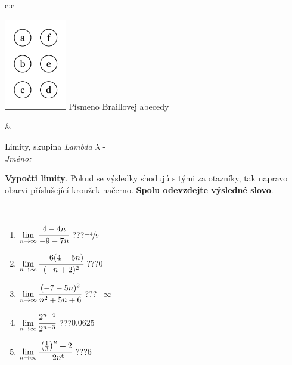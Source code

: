 \documentclass[10pt]{report}
\begin{document}
\begin{tabular}{c:c}
\begin{minipage}[c][104.5mm][t]{0.5\linewidth}
\begin{center}
\begin{minipage}{0.20\linewidth}
\begin{center}
\includegraphics[height=40mm]{../images/braille.png}
{\small Písmeno Braillovej abecedy}
\end{center}
\end{minipage}
\end{center}
\end{minipage}
&
\begin{minipage}[c][104.5mm][t]{0.5\linewidth}
\begin{center}
\vspace{7mm}
{\huge Limity, skupina \textit{Lambda $\lambda$} -}\\[5mm]
\textit{Jméno:}\phantom{xxxxxxxxxxxxxxxxxxxxxxxxxxxxxxxxxxxxxxxxxxxxxxxxxxxxxxxxxxxxxxxxx}\\[5mm]
\begin{minipage}{0.95\linewidth}
\begin{center}
\textbf{Vypočti limity}. Pokud se výsledky shodujú s tými za otazníky, tak napravo\\obarvi příslušející kroužek načerno. \textbf{Spolu odevzdejte výsledné slovo}.
\end{center}
\end{minipage}
\\[1mm]
\begin{minipage}{0.79\linewidth}
\begin{center}
\begin{varwidth}{\linewidth}
\begin{enumerate}
\normalsize
\item $\lim\limits_{n\to\infty}\cfrac{4-4n}{-9-7n}$\quad \dotfill\; ???\;\dotfill \quad $\nicefrac{-4}{9}$
\item $\lim\limits_{n\to\infty}\cfrac{-6(4-5n)}{(-n+2)^2}$\quad \dotfill\; ???\;\dotfill \quad $0$
\item $\lim\limits_{n\to\infty}\cfrac{(-7-5n)^2}{n^2+5n+6}$\quad \dotfill\; ???\;\dotfill \quad $-\infty$
\item $\lim\limits_{n\to\infty}\cfrac{2^{n-4}}{2^{n-3}}$\quad \dotfill\; ???\;\dotfill \quad $0.0625$
\item $\lim\limits_{n\to\infty}\cfrac{\left(\frac{1}{3}\right)^n +2}{-2n^{6}}$\quad \dotfill\; ???\;\dotfill \quad $6$

\end{enumerate}
\end{varwidth}
\end{center}
\end{minipage}
\end{center}
\end{minipage}
\end{tabular}
\end{document}
